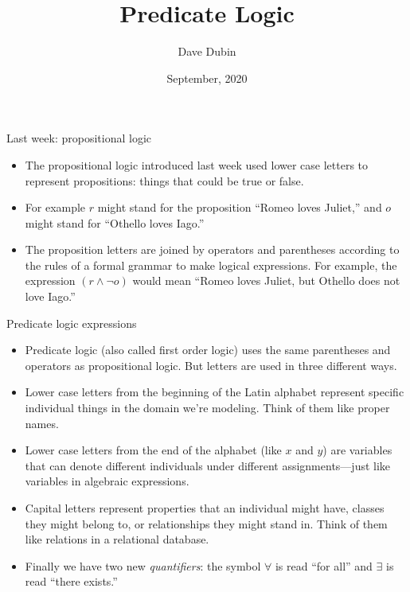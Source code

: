 \documentclass[
  ignorenonframetext,
]{beamer}
\title{Predicate Logic}
\author{Dave Dubin}
\date{September, 2020}
\providecommand{\tightlist}{%
  \setlength{\itemsep}{0pt}\setlength{\parskip}{0pt}}
\begin{document}
\frame{\titlepage}

\begin{frame}{Last week: propositional logic}
\protect\hypertarget{last-week-propositional-logic}{}

\begin{itemize}[<+->]
\tightlist
\item
  The propositional logic introduced last week used lower case letters
  to represent propositions: things that could be true or false.
\item
  For example \(r\) might stand for the proposition ``Romeo loves
  Juliet,'' and \(o\) might stand for ``Othello loves Iago.''
\item
  The proposition letters are joined by operators and parentheses
  according to the rules of a formal grammar to make logical
  expressions. For example, the expression \((r \wedge {\neg}o)\) would
  mean ``Romeo loves Juliet, but Othello does not love Iago.''
\end{itemize}

\end{frame}

\begin{frame}{Predicate logic expressions}
\protect\hypertarget{predicate-logic-expressions}{}

\begin{itemize}[<+->]
\tightlist
\item
  Predicate logic (also called first order logic) uses the same
  parentheses and operators as propositional logic. But letters are used
  in three different ways.
\item
  Lower case letters from the beginning of the Latin alphabet represent
  specific individual things in the domain we're modeling. Think of them
  like proper names.
\item
  Lower case letters from the end of the alphabet (like \(x\) and \(y\))
  are variables that can denote different individuals under different
  assignments---just like variables in algebraic expressions.\\
\item
  Capital letters represent properties that an individual might have,
  classes they might belong to, or relationships they might stand in. Think
  of them like relations in a relational database.
\item
  Finally we have two new \textit{quantifiers}: the symbol \(\forall\)
  is read ``for all'' and \(\exists\) is read ``there exists.''
\end{itemize}

\end{frame}
\end{document}
